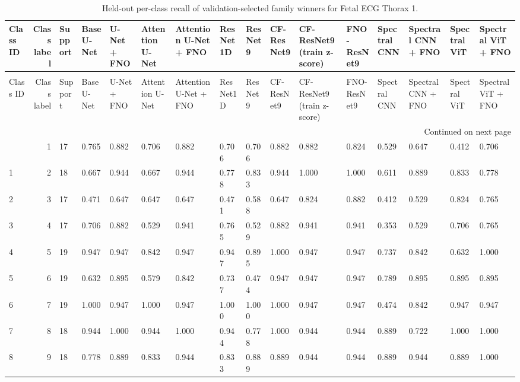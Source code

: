 \begin{longtable}{lrllllllllllllll}
\caption{Held-out per-class recall of validation-selected family winners for Fetal ECG Thorax 1.} \label{tab:noninvasivefetalecgthorax1_per_class_recall} \\
\toprule
Class ID & Class label & Support & Base U-Net & U-Net + FNO & Attention U-Net & Attention U-Net + FNO & ResNet1D & ResNet9 & CF-ResNet9 & CF-ResNet9 (train z-score) & FNO-ResNet9 & Spectral CNN & Spectral CNN + FNO & Spectral ViT & Spectral ViT + FNO \\
\midrule
\endfirsthead
\caption[]{Held-out per-class recall of validation-selected family winners for Fetal ECG Thorax 1.} \\
\toprule
Class ID & Class label & Support & Base U-Net & U-Net + FNO & Attention U-Net & Attention U-Net + FNO & ResNet1D & ResNet9 & CF-ResNet9 & CF-ResNet9 (train z-score) & FNO-ResNet9 & Spectral CNN & Spectral CNN + FNO & Spectral ViT & Spectral ViT + FNO \\
\midrule
\endhead
\midrule
\multicolumn{16}{r}{Continued on next page} \\
\midrule
\endfoot
\bottomrule
\endlastfoot
0 & 1 & 17 & 0.765 & 0.882 & 0.706 & 0.882 & 0.706 & 0.706 & 0.882 & 0.882 & 0.824 & 0.529 & 0.647 & 0.412 & 0.706 \\
1 & 2 & 18 & 0.667 & 0.944 & 0.667 & 0.944 & 0.778 & 0.833 & 0.944 & 1.000 & 1.000 & 0.611 & 0.889 & 0.833 & 0.778 \\
2 & 3 & 17 & 0.471 & 0.647 & 0.647 & 0.647 & 0.471 & 0.588 & 0.647 & 0.824 & 0.882 & 0.412 & 0.529 & 0.824 & 0.765 \\
3 & 4 & 17 & 0.706 & 0.882 & 0.529 & 0.941 & 0.765 & 0.529 & 0.882 & 0.941 & 0.941 & 0.353 & 0.529 & 0.706 & 0.765 \\
4 & 5 & 19 & 0.947 & 0.947 & 0.842 & 0.947 & 0.947 & 0.895 & 1.000 & 0.947 & 0.947 & 0.737 & 0.842 & 0.632 & 1.000 \\
5 & 6 & 19 & 0.632 & 0.895 & 0.579 & 0.842 & 0.737 & 0.474 & 0.947 & 0.947 & 0.947 & 0.789 & 0.895 & 0.895 & 0.895 \\
6 & 7 & 19 & 1.000 & 0.947 & 1.000 & 0.947 & 1.000 & 1.000 & 1.000 & 0.947 & 0.947 & 0.474 & 0.842 & 0.947 & 0.947 \\
7 & 8 & 18 & 0.944 & 1.000 & 0.944 & 1.000 & 0.944 & 0.778 & 1.000 & 0.944 & 0.944 & 0.889 & 0.722 & 1.000 & 1.000 \\
8 & 9 & 18 & 0.778 & 0.889 & 0.833 & 0.944 & 0.833 & 0.889 & 0.889 & 0.944 & 0.944 & 0.889 & 0.944 & 0.889 & 1.000 \\

\end{longtable}
